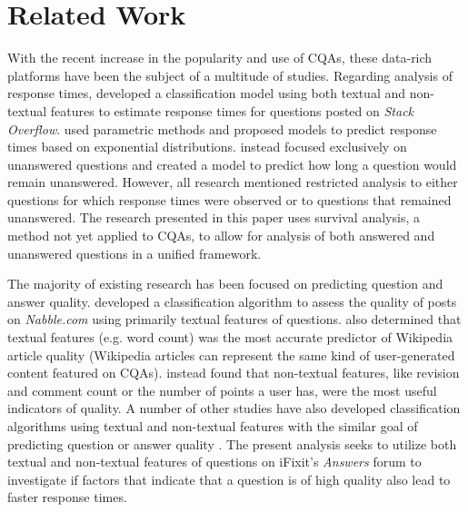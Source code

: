 \documentclass[preprint]{elsarticle}\usepackage[]{graphicx}\usepackage[]{color}
\begin{document}

\section{Related Work}

With the recent increase in the popularity and use of CQAs, these data-rich platforms have been the subject of a multitude of studies. Regarding analysis of response times, \cite{Bhat2014} developed a classification model using both textual and non-textual features to estimate response times for questions posted on \textit{Stack Overflow}. \cite{Mahmud2013} used parametric methods and proposed models to predict response times based on exponential distributions. \cite{Asaduzzaman2013} instead focused exclusively on unanswered questions and created a model to predict how long a question would remain unanswered. However, all research mentioned restricted analysis to either questions for which response times were observed or to questions that remained unanswered. The research presented in this paper uses survival analysis, a method not yet applied to CQAs, to allow for analysis of both answered and unanswered questions in a unified framework. 

The majority of existing research has been focused on predicting question and answer quality. \cite{Weimer2007} developed a classification algorithm to assess the quality of posts on \textit{Nabble.com} using primarily textual features of questions. \cite{Blumenstock2008} also determined that textual features (e.g. word count) was the most accurate predictor of Wikipedia article quality (Wikipedia articles can represent the same kind of user-generated content featured on CQAs). \cite{Fu2015} instead found that non-textual features, like revision and comment count or the number of points a user has, were the most useful indicators of quality. A number of other studies have also developed classification algorithms using textual and non-textual features with the similar goal of predicting question or answer quality \cite{Yao2015, Toba2014, Ponzanelli2014a, Ravi2014}. The present analysis seeks to utilize both textual and non-textual features of questions on iFixit's \textit{Answers} forum to investigate if factors that indicate that a question is of high quality also lead to faster response times.
\end{document}
